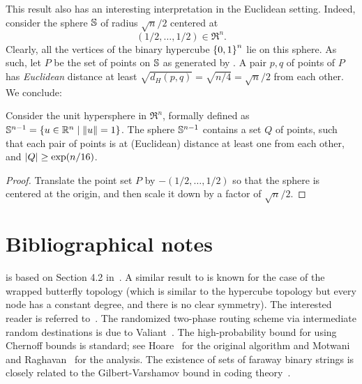 This result also has an interesting interpretation in the Euclidean
setting. Indeed, consider the sphere $\mathbb{S}$ of radius
$\sqrt{n}/2$ centered at
\begin{equation*}
    (1/2, \dots, 1/2) \in \Re^n.
\end{equation*}
Clearly, all the vertices of the binary hypercube $\left\{ {0,1} \right\}^n$ lie on
this sphere. As such, let $P$ be the set of points on $\mathbb{S}$ as
generated by . A pair $p,q$ of points of $P$ has
\emph{Euclidean} distance at least
$\sqrt{d_H(p,q)} = \sqrt{n/4} = \sqrt{n}/2$ from each other. We conclude:

\begin{lemma}
    Consider the unit hypersphere in $\Re^n$, formally defined as
    $\mathbb{S}^{n-1} = \left\{ u\in\mathbb{R}^n \;\middle\vert\; \left\| {u} \right\|=1 \right\}$. The sphere
    $\mathbb{S}^{n-1}$ contains a set $Q$ of points, such that each pair
    of points is at (Euclidean) distance at least one from each other,
    and $\left| {Q} \right| \geq \exp(n/16)$.
\end{lemma}

\begin{proof}
    Translate the point set $P$ by $-(1/2, \dots, 1/2)$ so that the
    sphere is centered at the origin, and then scale it down by a factor
    of $\sqrt{n}/2$.
\end{proof}

\section{Bibliographical notes}


 is based on Section 4.2 in~\cite{mr-ra-95}.  A similar
result to  is known for the case of the wrapped butterfly
topology (which is similar to the hypercube topology but every node has a
constant degree, and there is no clear symmetry). The interested reader
is referred to~\cite{mu-pcrap-05}.  The randomized two-phase routing
scheme via intermediate random destinations is due to
Valiant~\cite{v-sfpc-82}. The high-probability bound for \QuickSort{}
using Chernoff bounds is standard; see Hoare~\cite{h-q-62} for the
original algorithm and Motwani and Raghavan~\cite{mr-ra-95} for the
analysis. The existence of sets of faraway binary strings is closely
related to the Gilbert-Varshamov bound in coding theory~\cite{g-tce-52}.

